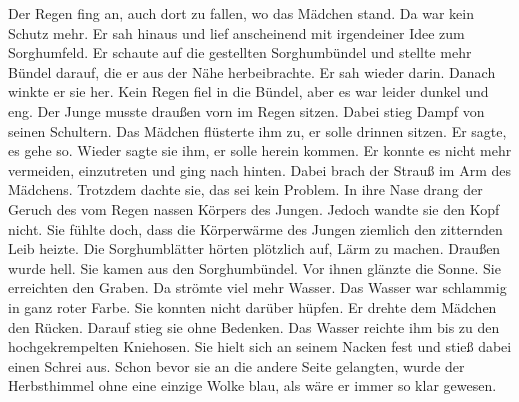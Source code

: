 \documentclass[prd,12pt,tightenlines,notitlepage,nofootinbib]{revtex4-1}
\begin{document}
Der Regen fing an, auch dort zu fallen, wo das Mädchen stand.  Da war kein Schutz
mehr.  Er sah hinaus und lief anscheinend mit irgendeiner Idee zum
Sorghumfeld.  Er schaute auf die gestellten Sorghumbündel und stellte mehr
Bündel darauf, die er aus der Nähe herbeibrachte.  Er sah wieder darin.
Danach winkte er sie her.  Kein Regen fiel in die Bündel, aber es war
leider dunkel und eng.  Der Junge musste draußen vorn im Regen
sitzen.  Dabei stieg Dampf von seinen Schultern.  Das Mädchen
flüsterte ihm zu, er solle drinnen sitzen.  Er sagte, es gehe so.  Wieder
sagte sie ihm, er solle herein kommen.  Er konnte es nicht mehr vermeiden,
einzutreten und ging nach hinten.
Dabei brach der Strauß im Arm des
Mädchens.  Trotzdem dachte sie, das sei kein Problem.  In ihre Nase drang
der Geruch des vom Regen nassen Körpers des Jungen.  Jedoch wandte
sie den Kopf nicht.  Sie fühlte doch, dass die Körperwärme des Jungen
ziemlich den zitternden Leib heizte.  Die Sorghumblätter hörten
plötzlich auf, Lärm zu machen.  Draußen wurde hell.  Sie kamen aus
den Sorghumbündel.  Vor ihnen glänzte die Sonne.  Sie
erreichten den Graben.  Da strömte viel mehr Wasser.  Das Wasser war
schlammig in ganz roter Farbe.  Sie konnten nicht darüber hüpfen.  Er
drehte dem Mädchen den Rücken.  Darauf stieg sie ohne Bedenken.  Das
Wasser reichte ihm bis zu den hochgekrempelten Kniehosen.  Sie hielt
sich an seinem Nacken fest und stieß dabei einen Schrei aus.  Schon
bevor sie an die andere Seite gelangten, wurde der Herbsthimmel ohne
eine einzige Wolke blau, als wäre er immer so klar gewesen.
\end{document}
